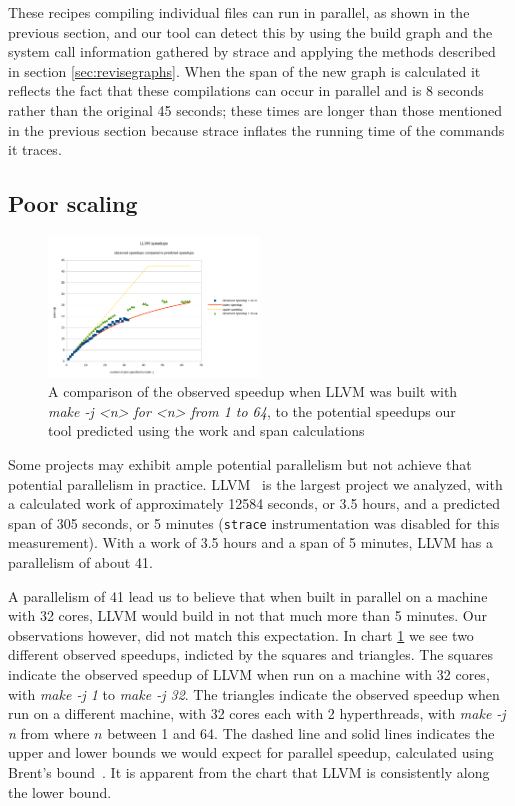 \documentclass[sigconf,10pt,authorversion]{acmart}\settopmatter{printfolios=true,printccs=false,printacmref=false}
\begin{document}
  These recipes compiling individual files can run in parallel, as shown in the previous section,
  and our tool can detect this by using the build graph and the system call information gathered
  by strace and applying the methods described in section \ref{sec:revisegraphs}.  When the span
  of the new graph is calculated it reflects the fact that these compilations can occur in
  parallel and is 8 seconds rather than the original 45 seconds; these times are longer than
  those mentioned in the previous section because strace inflates the running time of the
  commands it traces.

\subsection{Poor scaling}
\label{sec:scalability}

\begin{figure}[t]
  \includegraphics[width=0.5\textwidth]{llvm-speedup-w-64}
  \caption{A comparison of the observed speedup when LLVM was built
    with \emph{make -j <n> for <n> from 1 to 64}, to the potential
    speedups our tool predicted using the work and span calculations}
  \label{fig:llvm}
\end{figure}

Some projects may exhibit ample potential parallelism but not achieve
that potential parallelism in practice.  LLVM~\citep{LLVM:CGO04} is
the largest project we analyzed, with a calculated work of
approximately 12584 seconds, or 3.5 hours, and a predicted span of 305
seconds, or 5 minutes (\verb|strace| instrumentation was disabled for
this measurement). With a work of 3.5 hours and a span of 5 minutes,
LLVM has a parallelism of about 41.

A parallelism of 41 lead us to believe that when built in parallel on
a machine with 32 cores, LLVM would build in not that much more than 5
minutes.  Our observations however, did not match this expectation.
In chart \ref{fig:llvm} we see two different observed speedups,
indicted by the squares and triangles.  The squares indicate the
observed speedup of LLVM when run on a machine with 32 cores, with
\emph{make -j 1} to \emph{make -j 32}.  The triangles indicate the
observed speedup when run on a different machine, with 32 cores each
with 2 hyperthreads, with \emph{make -j n} from where $n$ between 1
and 64.  The dashed line and solid lines indicates the upper and lower
bounds we would expect for parallel speedup, calculated using Brent's
bound~\cite{brents}.  It
is apparent from the chart that LLVM is consistently along the lower
bound.
\end{document}
